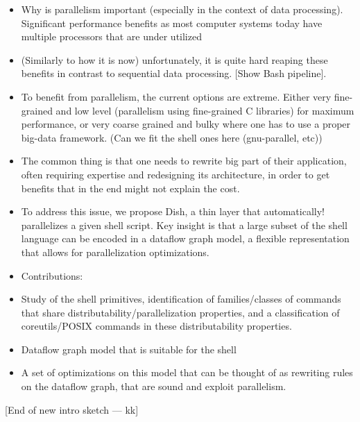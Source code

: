 \documentclass[letterpaper,twocolumn,10pt]{article}
\newcommand{\kk}[1]{[{\color{magenta}#1 --- kk}]}
\begin{document}
\begin{itemize}
\item Why is parallelism important (especially in the context of data
  processing). Significant performance benefits as most computer
  systems today have multiple processors that are under utilized
\item (Similarly to how it is now) unfortunately, it is quite hard
  reaping these benefits in contrast to sequential data
  processing. [Show Bash pipeline].
\item To benefit from parallelism, the current options are
  extreme. Either very fine-grained and low level (parallelism using
  fine-grained C libraries) for maximum performance, or very coarse
  grained and bulky where one has to use a proper big-data
  framework. (Can we fit the shell ones here (gnu-parallel, etc))
\item The common thing is that one needs to rewrite big part of their
  application, often requiring expertise and redesigning its
  architecture, in order to get benefits that in the end might not
  explain the cost.
\item To address this issue, we propose Dish, a thin layer that
  automatically! parallelizes a given shell script. Key insight is
  that a large subset of the shell language can be encoded in a
  dataflow graph model, a flexible representation that allows for
  parallelization optimizations.
\item Contributions:
\item Study of the shell primitives, identification of
  families/classes of commands that share
  distributability/parallelization properties, and a classification of
  coreutils/POSIX commands in these distributability properties.
\item Dataflow graph model that is suitable for the shell
\item A set of optimizations on this model that can be thought of as
  rewriting rules on the dataflow graph, that are sound and exploit
  parallelism.
\end{itemize}

\kk{End of new intro sketch}

% 
\end{document}
